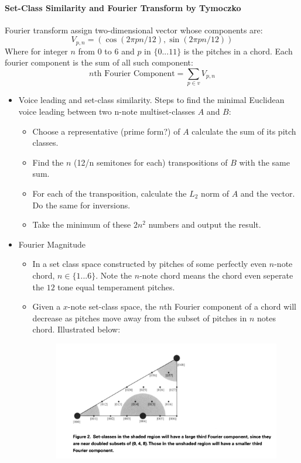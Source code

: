 \documentclass[12pt]{report}
\begin{document}
\paragraph*{Set-Class Similarity and Fourier Transform by Tymoczko}
Fourier transform assign two-dimensional vector whose components are:
\[V_{p,n}=(\cos(2\pi pn/12), \sin(2\pi pn/12))\]
Where for integer $n$ from $0$ to $6$ and $p$ in $\{0...11\}$ is the pitches
in a chord. Each fourier component is the sum of all such component:
\[n\text{th Fourier Component}=\sum_{p\in v}V_{p,n}\]
\begin{itemize}
    \item Voice leading and set-class similarity. Steps
    to find the minimal Euclidean voice leading between two n-note 
    multiset-classes $A$ and $B$:
        \begin{itemize}
            \item Choose a representative (prime form?) of $A$ calculate 
            the sum of its pitch classes.
            \item Find the $n$ (12/n semitones for each) 
            transpositions of $B$ with the same sum.
            \item For each of the transposition, calculate the $L_2$
            norm of $A$ and the vector. Do the same for inversions.
            \item Take the minimum of these $2n^2$ numbers and output the 
            result.
        \end{itemize}
    \item Fourier Magnitude
        \begin{itemize}
            \item In a set class space constructed by pitches of some 
            perfectly even $n$-note chord, $n\in\{1...6\}$. Note the $n$-note
            chord means the chord even seperate the $12$ tone equal 
            temperament pitches. 
            \item Given a $x$-note set-class space, the $n$th Fourier component of a chord will decrease 
            as pitches move away from the subset of pitches in $n$ notes 
            chord. Illustrated below:
            \begin{figure}[h]
                \includegraphics[scale=0.5]{Tymoczko_1.png}

\end{figure}
\end{itemize}
\end{itemize}
\end{document}

